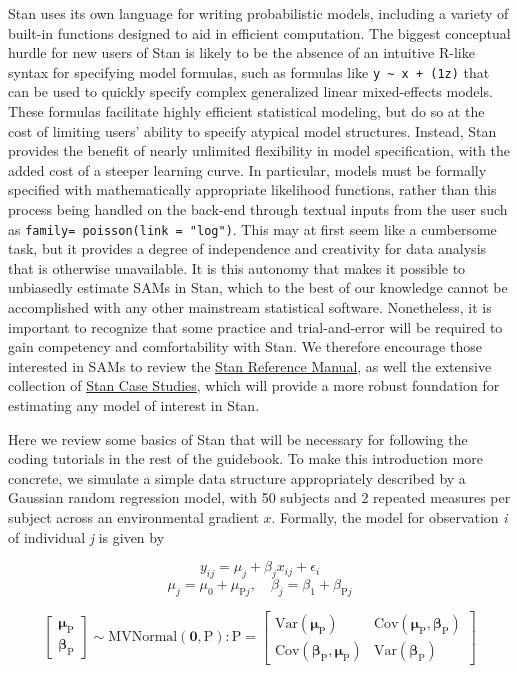 \documentclass[
]{book}
\begin{document}
Stan uses its own language for writing probabilistic models, including a variety of built-in functions designed to aid in efficient computation. The biggest conceptual hurdle for new users of Stan is likely to be the absence of an intuitive R-like syntax for specifying model formulas, such as formulas like \texttt{y\ \textasciitilde{}\ x\ +\ (1\textbar{}z)} that can be used to quickly specify complex generalized linear mixed-effects models. These formulas facilitate highly efficient statistical modeling, but do so at the cost of limiting users' ability to specify atypical model structures. Instead, Stan provides the benefit of nearly unlimited flexibility in model specification, with the added cost of a steeper learning curve. In particular, models must be formally specified with mathematically appropriate likelihood functions, rather than this process being handled on the back-end through textual inputs from the user such as \texttt{family=\ poisson(link\ =\ "log")}. This may at first seem like a cumbersome task, but it provides a degree of independence and creativity for data analysis that is otherwise unavailable. It is this autonomy that makes it possible to unbiasedly estimate SAMs in Stan, which to the best of our knowledge cannot be accomplished with any other mainstream statistical software. Nonetheless, it is important to recognize that some practice and trial-and-error will be required to gain competency and comfortability with Stan. We therefore encourage those interested in SAMs to review the \href{https://mc-stan.org/docs/2_25/reference-manual/index.html}{Stan Reference Manual}, as well the extensive collection of \href{https://mc-stan.org/users/documentation/case-studies}{Stan Case Studies}, which will provide a more robust foundation for estimating any model of interest in Stan.

Here we review some basics of Stan that will be necessary for following the coding tutorials in the rest of the guidebook. To make this introduction more concrete, we simulate a simple data structure appropriately described by a Gaussian random regression model, with 50 subjects and 2 repeated measures per subject across an environmental gradient \(x\). Formally, the model for observation \emph{i} of individual \emph{j} is given by

\[y_{ij}=\mu_{j}+\beta_{j}x_{ij}+\epsilon_i\]
\[\mu_j=\mu_0+\mu_{\mathrm{P}j},  \quad  \beta_j=\beta_1+\beta_{\mathrm{P}j}\]

\[ \begin{bmatrix}
\boldsymbol{\mu_{\mathrm{P}}} \\ 
\boldsymbol{\beta_{\mathrm{P}}} 
\end{bmatrix} \sim \mathrm{MVNormal}(\boldsymbol{0}, \boldsymbol{\mathrm{P}} ) : 
\boldsymbol{\mathrm{P}} =
\begin{bmatrix}
\mathrm{Var}( \boldsymbol{\mu_{\mathrm{P}}} ) &  
\mathrm{Cov}( \boldsymbol{\mu_{\mathrm{P}}},  \boldsymbol{\beta_{\mathrm{P}}})     \\ 
\mathrm{Cov}(\boldsymbol{\beta_{\mathrm{P}}}, \boldsymbol{\mu_{\mathrm{P}}} ) & 
\mathrm{Var}( \boldsymbol{\beta_{\mathrm{P}}} )
\end{bmatrix} \]
\end{document}
